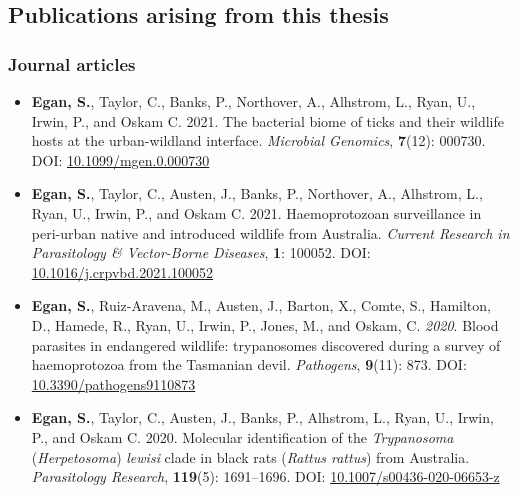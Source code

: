 \documentclass[a4paper, nobind]{templates/ociamthesis}
\providecommand{\tightlist}{%
  \setlength{\itemsep}{0pt}\setlength{\parskip}{0pt}}
\begin{document}
\hypertarget{publications-arising-from-this-thesis}{%
\subsection*{Publications arising from this thesis}\label{publications-arising-from-this-thesis}}

\hypertarget{journal-articles}{%
\subsubsection*{Journal articles}\label{journal-articles}}

\begin{itemize}
\tightlist
\item
  \textbf{Egan, S.}, Taylor, C., Banks, P., Northover, A., Alhstrom, L., Ryan, U., Irwin, P., and Oskam C. 2021. The bacterial biome of ticks and their wildlife hosts at the urban-wildland interface. \emph{Microbial Genomics}, \textbf{7}(12): 000730. DOI: \href{https://doi.org/10.1099/mgen.0.000730}{10.1099/mgen.0.000730}
\item
  \textbf{Egan, S.}, Taylor, C., Austen, J., Banks, P., Northover, A., Alhstrom, L., Ryan, U., Irwin, P., and Oskam C. 2021. Haemoprotozoan surveillance in peri-urban native and introduced wildlife from Australia. \emph{Current Research in Parasitology \& Vector-Borne Diseases}, \textbf{1}: 100052. DOI: \href{https://doi.org/10.1016/j.crpvbd.2021.100052}{10.1016/j.crpvbd.2021.100052}
\item
  \textbf{Egan, S.}, Ruiz-Aravena, M., Austen, J., Barton, X., Comte, S., Hamilton, D., Hamede, R., Ryan, U., Irwin, P., Jones, M., and Oskam, C. \emph{2020}. Blood parasites in endangered wildlife: trypanosomes discovered during a survey of haemoprotozoa from the Tasmanian devil. \emph{Pathogens}, \textbf{9}(11): 873. DOI: \href{https://doi.org/10.3390/pathogens9110873}{10.3390/pathogens9110873}
\item
  \textbf{Egan, S.}, Taylor, C., Austen, J., Banks, P., Alhstrom, L., Ryan, U., Irwin, P., and Oskam C. 2020. Molecular identification of the \emph{Trypanosoma} (\emph{Herpetosoma}) \emph{lewisi} clade in black rats (\emph{Rattus rattus}) from Australia. \emph{Parasitology Research}, \textbf{119}(5): 1691--1696. DOI: \href{https://doi.org/10.1007/s00436-020-06653-z}{10.1007/s00436-020-06653-z}
\end{itemize}
\end{document}
